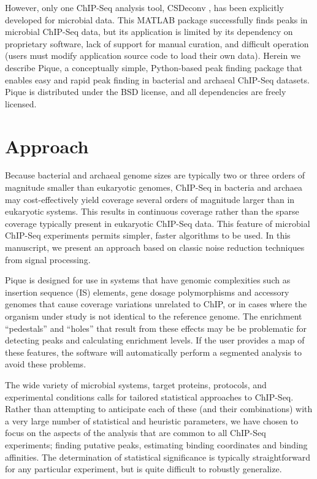 \begin{refsection}
However, only one ChIP-Seq analysis tool, CSDeconv \cite{CSDeconv},
has been explicitly developed for microbial data.  This MATLAB package
successfully finds peaks in microbial ChIP-Seq data, but its
application is limited by its dependency on proprietary software, lack
of support for manual curation, and difficult operation (users must
modify application source code to load their own
data). \cite{wilbanks} Herein we describe Pique, a conceptually
simple, Python-based peak finding package that enables easy and rapid
peak finding in bacterial and archaeal ChIP-Seq datasets. Pique is
distributed under the BSD license, and all dependencies are freely
licensed.

\section{Approach}

\noindent Because bacterial and archaeal genome sizes are typically
two or three orders of magnitude smaller than eukaryotic genomes,
ChIP-Seq in bacteria and archaea may cost-effectively yield coverage
several orders of magnitude larger than in eukaryotic systems. This
results in continuous coverage rather than the sparse coverage
typically present in eukaryotic ChIP-Seq data.  This feature of
microbial ChIP-Seq experiments permits simpler, faster algorithms to
be used. In this manuscript, we present an approach based on classic
noise reduction techniques from signal processing.

Pique is designed for use in systems that have genomic complexities
such as insertion sequence (IS) elements, gene dosage polymorphisms
and accessory genomes that cause coverage variations unrelated to
ChIP, or in cases where the organism under study is not identical to
the reference genome. The enrichment ``pedestals'' and ``holes'' that
result from these effects may be be problematic for detecting peaks
and calculating enrichment levels. If the user provides a map of these
features, the software will automatically perform a segmented
analysis to avoid these problems.

The wide variety of microbial systems, target proteins, protocols, and
experimental conditions calls for tailored statistical approaches to
ChIP-Seq. Rather than attempting to anticipate each of these (and
their combinations) with a very large number of statistical and
heuristic parameters, we have chosen to focus on the aspects of the
analysis that are common to all ChIP-Seq experiments; finding putative
peaks, estimating binding coordinates and binding affinities. The
determination of statistical significance is typically straightforward
for any particular experiment, but is quite difficult to robustly
generalize.


\end{refsection}
